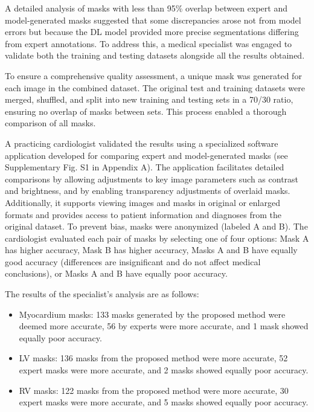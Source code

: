 \documentclass[fleqn,10pt]{wlscirep}
\begin{document}
A detailed analysis of masks with less than 95\% overlap between expert and model-generated masks suggested that some discrepancies arose not from model errors but because the DL model provided more precise segmentations differing from expert annotations. To address this, a medical specialist was engaged to validate both the training and testing datasets alongside all the results obtained.

To ensure a comprehensive quality assessment, a unique mask was generated for each image in the combined dataset. The original test and training datasets were merged, shuffled, and split into new training and testing sets in a 70/30 ratio, ensuring no overlap of masks between sets. This process enabled a thorough comparison of all masks.

A practicing cardiologist validated the results using a specialized software application developed for comparing expert and model-generated masks (see Supplementary Fig. S1 in Appendix A). The application facilitates detailed comparisons by allowing adjustments to key image parameters such as contrast and brightness, and by enabling transparency adjustments of overlaid masks. Additionally, it supports viewing images and masks in original or enlarged formats and provides access to patient information and diagnoses from the original dataset. To prevent bias, masks were anonymized (labeled A and B). The cardiologist evaluated each pair of masks by selecting one of four options: Mask A has higher accuracy, Mask B has higher accuracy, Masks A and B have equally good accuracy (differences are insignificant and do not affect medical conclusions), or Masks A and B have equally poor accuracy.

The results of the specialist’s analysis are as follows:

\begin{itemize}
    \item Myocardium masks: 133 masks generated by the proposed method were deemed more accurate, 56 by experts were more accurate, and 1 mask showed equally poor accuracy.
    \item LV masks: 136 masks from the proposed method were more accurate, 52 expert masks were more accurate, and 2 masks showed equally poor accuracy.
    \item RV masks: 122 masks from the proposed method were more accurate, 30 expert masks were more accurate, and 5 masks showed equally poor accuracy.
\end{itemize}
\end{document}
